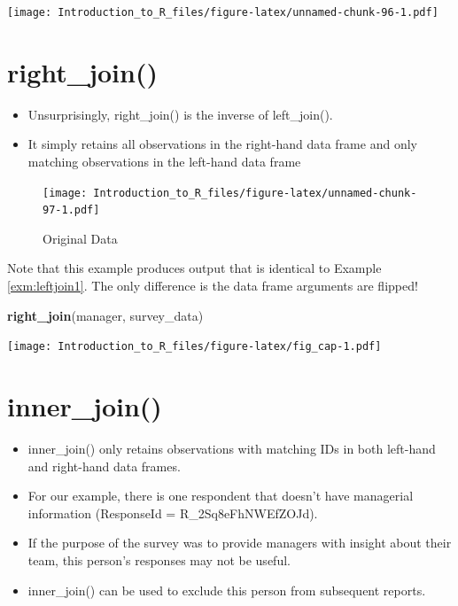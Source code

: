 \documentclass[]{book}
\newenvironment{Shaded}{\begin{snugshade}}{\end{snugshade}}
\newcommand{\KeywordTok}[1]{\textcolor[rgb]{0.13,0.29,0.53}{\textbf{#1}}}
\newcommand{\NormalTok}[1]{#1}
\providecommand{\tightlist}{%
  \setlength{\itemsep}{0pt}\setlength{\parskip}{0pt}}
\theoremstyle{definition}
\theoremstyle{definition}
\theoremstyle{definition}
\theoremstyle{remark}
\let\BeginKnitrBlock\begin \let\EndKnitrBlock\end
\begin{document}
\texttt{[image: Introduction\_to\_R\_files/figure-latex/unnamed-chunk-96-1.pdf]}

\hypertarget{right_join}{%
\section{right\_join()}\label{right_join}}

\begin{itemize}
\tightlist
\item
  Unsurprisingly, right\_join() is the inverse of left\_join().
\item
  It simply retains all observations in the right-hand data frame and only matching observations in the left-hand data frame
\end{itemize}

\begin{figure}
\centering
\texttt{[image: Introduction\_to\_R\_files/figure-latex/unnamed-chunk-97-1.pdf]}
\caption{\label{fig:unnamed-chunk-97}Original Data}
\end{figure}

\BeginKnitrBlock{example}
\protect\hypertarget{exm:righjoin1}{}{\label{exm:righjoin1} }Note that this example produces output that is identical to Example \ref{exm:leftjoin1}. The only difference is the data frame arguments are flipped!
\EndKnitrBlock{example}

\begin{Shaded}
\begin{Highlighting}[]
\KeywordTok{right_join}\NormalTok{(manager, survey_data)}
\end{Highlighting}
\end{Shaded}

\texttt{[image: Introduction\_to\_R\_files/figure-latex/fig\_cap-1.pdf]}

\hypertarget{inner_join}{%
\section{inner\_join()}\label{inner_join}}

\begin{itemize}
\tightlist
\item
  inner\_join() only retains observations with matching IDs in both left-hand and right-hand data frames.
\item
  For our example, there is one respondent that doesn't have managerial information (ResponseId = R\_2Sq8eFhNWEfZOJd).
\item
  If the purpose of the survey was to provide managers with insight about their team, this person's responses may not be useful.
\item
  inner\_join() can be used to exclude this person from subsequent reports.
\end{itemize}
\end{document}
